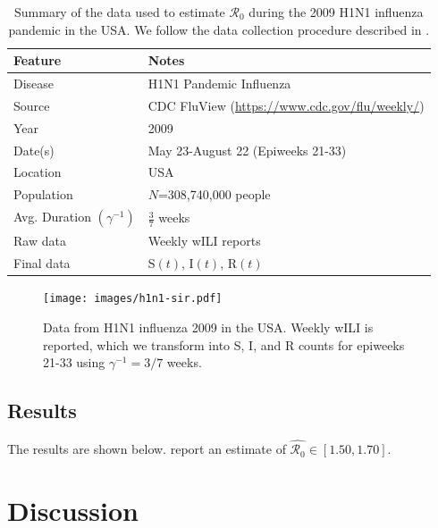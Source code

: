 \documentclass[12pt]{article}
\newcommand{\rr}{\ensuremath{\mathcal{R}_0}}
\begin{document}
\begin{table}[H]
\centering
\begin{tabular}{@{}ll@{}}
\toprule
Feature       & Notes                                                                   \\ \midrule
Disease       & H1N1 Pandemic Influenza                                                 \\
Source        & CDC FluView (\url{https://www.cdc.gov/flu/weekly/})      \\
Year          & 2009                                                                    \\
Date(s)          & May 23-August 22 (Epiweeks 21-33)                                       \\
Location      & USA                                                                     \\
Population    & $N$=308,740,000 people                                                  \\
  Avg. Duration $\left ( \gamma^{-1}\right )$ & $\frac{3}{7}$ weeks\\
  Raw data & Weekly wILI reports\\
  Final data & S$(t)$, I$(t)$, R$(t)$ \\\bottomrule
\end{tabular}
\caption{Summary of the data used to estimate $\rr$ during the 2009 H1N1 influenza pandemic in the USA.  We follow the data collection procedure described in \cite{towers2009}.}
\label{tab:h1n1-data}
\end{table}

\begin{figure}[H]
  \centering
  \texttt{[image: images/h1n1-sir.pdf]}
  \caption{Data from H1N1 influenza 2009 in the USA.  Weekly wILI is reported, which we transform into S, I, and R counts for epiweeks 21-33 using $\gamma^{-1} = 3/7$ weeks.}
  \end{figure}
      

      \subsection{Results}
      The results are shown below.  \cite{towers2009} report an estimate of $\hat{\rr} \in [1.50, 1.70]$.

      

      
\section{Discussion}\label{sec:discussion}
\end{document}
